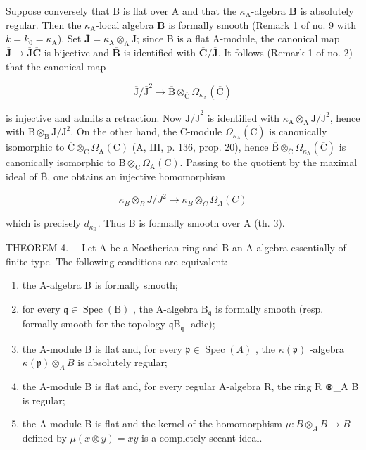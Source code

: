 Suppose conversely that B is flat over A and that the \(\kappa_{\mathrm{A}}\)-algebra \(\overline{\mathbf{B}}\) is absolutely regular. Then the \(\kappa_{\mathrm{A}}\)-local algebra \(\overline{\mathbf{B}}\) is formally smooth (Remark 1 of no. 9 with \(k = k_0 = \kappa_{\mathrm{A}}\)). Set \(\overline{\mathbf{J}} = \kappa_{\mathrm{A}} \otimes_{\mathrm{A}} \mathrm{J}\); since B is a flat A-module, the canonical map \(\overline{\mathbf{J}} \to \overline{\mathbf{J}}\overline{\mathbf{C}}\) is bijective and \(\overline{\mathbf{B}}\) is identified with \(\overline{\mathbf{C}}/\overline{\mathbf{J}}\). It follows (Remark 1 of no. 2) that the canonical map

\[
\overline {{\mathrm{J}}} / \overline {{\mathrm{J}}} ^ {2} \longrightarrow \overline {{\mathrm{B}}} \otimes_ {\overline {{\mathrm{C}}}} \Omega_ {\kappa_ {\mathrm{A}}} (\overline {{\mathrm{C}}})
\]

is injective and admits a retraction. Now \(\overline{\mathrm{J}}/\overline{\mathrm{J}}^{2}\) is identified with \(\kappa_{\mathrm{A}}\otimes_{\mathrm{A}}\mathrm{J}/\mathrm{J}^{2}\), hence with \(\overline{\mathrm{B}}\otimes_{\mathrm{B}}\mathrm{J}/\mathrm{J}^{2}\). On the other hand, the \(\overline{\mathrm{C}}\)-module \(\Omega_{\kappa_{\mathrm{A}}}(\overline{\mathrm{C}})\) is canonically isomorphic to \(\overline{\mathrm{C}}\otimes_{\mathrm{C}}\Omega_{\mathrm{A}}(\mathrm{C})\) (A, III, p. 136, prop. 20), hence \(\overline{\mathrm{B}}\otimes_{\overline{\mathrm{C}}}\Omega_{\kappa_{\mathrm{A}}}(\overline{\mathrm{C}})\) is canonically isomorphic to \(\overline{\mathrm{B}}\otimes_{\mathrm{C}}\Omega_{\mathrm{A}}(\mathrm{C})\). Passing to the quotient by the maximal ideal of \(\overline{\mathrm{B}}\), one obtains an injective homomorphism

\[
\kappa_ {B} \otimes_ {B} J / J ^ {2} \longrightarrow \kappa_ {B} \otimes_ {C} \Omega_ {A} (C)
\]

which is precisely \(\bar{d}_{\kappa_{\mathrm{B}}}\). Thus B is formally smooth over A (th. 3).

THEOREM 4.--- Let A be a Noetherian ring and B an A-algebra essentially of finite type. The following conditions are equivalent:

\begin{enumerate}
\def\labelenumi{(\roman{enumi})}
\item
  the A-algebra B is formally smooth;
\item
  for every \(\mathfrak{q} \in \operatorname{Spec}(\mathrm{B})\) , the A-algebra \(\mathrm{B}_{\mathfrak{q}}\) is formally smooth (resp. formally smooth for the topology \(\mathfrak{q}\mathrm{B}_{\mathfrak{q}}\) -adic);
\item
  the A-module B is flat and, for every \(\mathfrak{p} \in \operatorname{Spec}(A)\) , the \(\kappa(\mathfrak{p})\) -algebra \(\kappa(\mathfrak{p}) \otimes_{A} B\) is absolutely regular;
\item
  the A-module B is flat and, for every regular A-algebra R, the ring R ⊗\_A B is regular;
\item
  the A-module B is flat and the kernel of the homomorphism \(\mu:B\otimes_{A}B\to B\) defined by \(\mu(x\otimes y)=xy\) is a completely secant ideal.
\end{enumerate}

